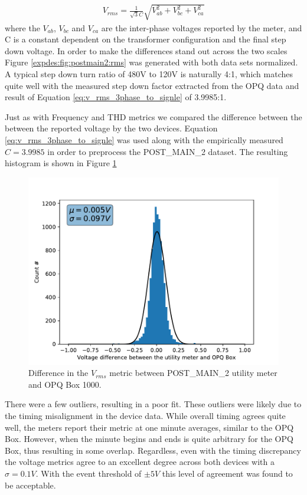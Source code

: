 \begin{equation}\label{eq:v_rms_3phase_to_signle}
\begin{aligned}
    V_{rms} = \frac{1}{\sqrt{3}C}\sqrt{V_{ab}^2 + V_{bc}^2 +V_{ca}^2}
\end{aligned}
\end{equation}
where the $V_{ab}$, $V_{bc}$ and $V_{ca}$ are the inter-phase voltages reported by the meter, and C is a constant dependent on the transformer configuration and the final step down voltage.
In order to make the differences stand out across the two scales Figure \ref{expdes:fig:postmain2:rms} was generated with both data sets normalized.
A typical step down turn ratio of 480V to 120V is naturally 4:1, which matches quite well with the measured step down factor extracted from the OPQ data and result of Equation \ref{eq:v_rms_3phase_to_signle} of 3.9985:1.

Just as with Frequency and THD metrics we compared the difference between the between the reported voltage by the two devices.
Equation \ref{eq:v_rms_3phase_to_signle} was used along with the empirically measured $C = 3.9985$ in order to preprocess the POST\_MAIN\_2 dataset.
The resulting histogram is shown in Figure \ref{expdes:fig:postmain2:rms_diff}

\begin{figure}[ht!]
    \centering
    \includegraphics[width=0.7\linewidth]{img/napali_eval/gt/gt_rms_diff.pdf}
    \caption{Difference in the $V_{rms}$ metric between POST\_MAIN\_2 utility meter and OPQ Box 1000.}
    \label{expdes:fig:postmain2:rms_diff}
\end{figure}

There were a few outliers, resulting in a poor fit.
These outliers were likely due to the timing misalignment in the device data.
While overall timing agrees quite well, the meters report their metric at one minute averages, similar to the OPQ Box.
However, when the minute begins and ends is quite arbitrary for the OPQ Box, thus resulting in some overlap.
Regardless, even with the timing discrepancy the voltage metrics agree to an excellent degree across both devices with a $\sigma=0.1V$.
With the event threshold of $\pm5V$ this level of agreement was found to be acceptable.

